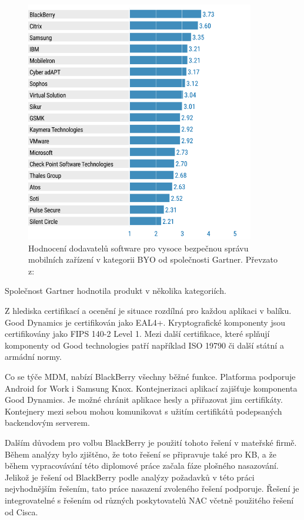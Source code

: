 \begin{figure}[h!]\label{GartnerBB}
\centering
\includegraphics[width=10cm]{img/GartnerBB}
\caption{Hodnocení dodavatelů software pro vysoce bezpečnou správu mobilních zařízení v kategorii BYO od společnosti Gartner. Převzato z: \cite{GartnerSecurity}}
\end{figure}%

Společnost Gartner hodnotila produkt v několika kategoriích. 

Z hlediska certifikací a ocenění je situace rozdílná pro každou aplikaci v balíku. Good Dynamics je certifikován jako EAL4+. Kryptografické komponenty jsou certifikovány jako FIPS 140-2 Level 1. Mezi další certifikace, které splňují komponenty od Good technologies patří například ISO 19790 či další státní a armádní normy.

Co se týče MDM, nabízí BlackBerry všechny běžné funkce. Platforma podporuje Android for Work i Samsung Knox. Kontejnerizaci aplikací zajišťuje komponenta Good Dynamics. Je možné chránit aplikace hesly a přiřazovat jim certifikáty. Kontejnery mezi sebou mohou komunikovat s užitím certifikátů podepsaných backendovým serverem. 


Dalším důvodem pro volbu BlackBerry je použití tohoto řešení v mateřské firmě. Během analýzy bylo zjištěno, že toto řešení se připravuje také pro KB, a že během vypracovávání této diplomové práce začala fáze plošného nasazování. Jelikož je řešení od BlackBerry podle analýzy požadavků v této práci nejvhodnějším řešením, tato práce nasazení zvoleného řešení podporuje. Řešení je integrovatelné s řešením od různých poskytovatelů NAC včetně použitého řešení od Cisca.    


